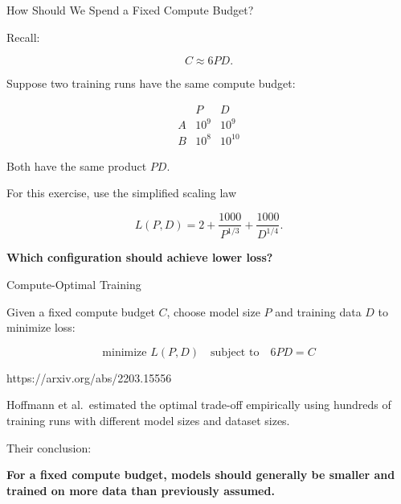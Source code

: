 \documentclass[11pt,compress,t,notes=noshow, xcolor=table]{beamer}
\begin{document}
\begin{vbframe}{How Should We Spend a Fixed Compute Budget?}

Recall:

\[
C \approx 6PD.
\]

Suppose two training runs have the same compute budget:

\[
\begin{array}{c|cc}
 & P & D \\
\hline
A & 10^9 & 10^9 \\
B & 10^8 & 10^{10}
\end{array}
\]

Both have the same product $PD$.

For this exercise, use the simplified scaling law

\[
L(P,D)
=
2
+
\frac{1000}{P^{1/3}}
+
\frac{1000}{D^{1/4}}.
\]

\begin{center}
\textbf{Which configuration should achieve lower loss?}
\end{center}

\end{vbframe}



\begin{vbframe}{Compute-Optimal Training}

Given a fixed compute budget $C$, choose model size $P$
and training data $D$ to minimize loss:

\[
\boxed{
\text{minimize } L(P,D)
\quad\text{subject to}\quad
6PD = C
}
\]

{https://arxiv.org/abs/2203.15556}

Hoffmann et al.\ estimated the optimal trade-off empirically using
hundreds of training runs with different model sizes and dataset sizes.

Their conclusion:

\begin{center}
\textbf{For a fixed compute budget, models should generally be
smaller and trained on more data than previously assumed.}
\end{center}

\end{vbframe}

\end{document}
